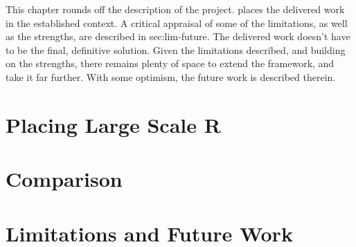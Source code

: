 This chapter rounds off the description of the project.
 places the delivered work in the established context.
A critical appraisal of some of the limitations, as well as the strengths, are described in sec:lim-future.
The delivered work doesn't have to be the final, definitive solution.
Given the limitations described, and building on the strengths, there remains plenty of space to extend the \lsr{} framework, and take it far further.
With some optimism, the future work is described therein.

\section{Placing Large Scale R}\label{sec:placing}

\section{Comparison}\label{sec:comp-lsr}

\section{Limitations and Future Work}\label{sec:lim-future}

